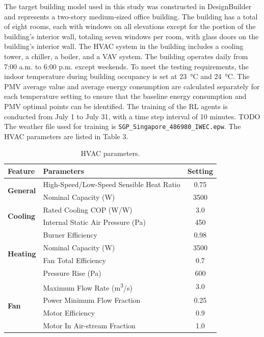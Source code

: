 \documentclass[preprint,12pt]{elsarticle}
\begin{document}

The target building model used in this study was constructed in DesignBuilder 
and represents a two-story medium-sized office building. 
The building has a total of eight rooms, each with windows on all elevations 
except for the portion of the building's interior wall, totaling seven windows per room, 
with glass doors on the building's interior wall. The HVAC system in the building 
includes a cooling tower, a chiller, a boiler, and a VAV system. 
The building operates daily from 7:00 a.m. to 6:00 p.m. except weekends.
To meet the testing requirements, the indoor temperature during building occupancy 
is set at \SI{23}{\celsius} and \SI{24}{\celsius}.
The PMV average value and average energy consumption are calculated 
separately for each temperature setting to ensure that the baseline energy consumption 
and PMV optimal points can be identified. 
The training of the RL agents is conducted from July 1 to July 31, 
with a time step interval of 10 minutes. 
TODO The weather file used for training is \texttt{SGP_Singapore_486980_IWEC.epw}.
The HVAC parameters are listed in Table 3. 
\begin{table}[h!]
\centering
\caption{HVAC parameters.}
\begin{tabular}{@{}llc@{}}
\toprule
\textbf{Feature} & \textbf{Parameters} & \textbf{Setting} \\ \midrule
\multirow{2}{*}{\textbf{General}} 
    & High-Speed/Low-Speed Sensible Heat Ratio & 0.75 \\
    & Nominal Capacity (W) & 3500 \\ \midrule
\multirow{2}{*}{\textbf{Cooling}} 
    & Rated Cooling COP (W/W) & 3.0 \\
    & Internal Static Air Pressure (Pa) & 450 \\ \midrule
\multirow{4}{*}{\textbf{Heating}} 
    & Burner Efficiency & 0.98 \\
    & Nominal Capacity (W) & 3500 \\
    & Fan Total Efficiency & 0.7 \\
    & Pressure Rise (Pa) & 600 \\ \midrule
\multirow{4}{*}{\textbf{Fan}} 
    & Maximum Flow Rate (m\textsuperscript{3}/s) & 3.0 \\
    & Power Minimum Flow Fraction & 0.25 \\
    & Motor Efficiency & 0.9 \\
    & Motor In Air-stream Fraction & 1.0 \\ \bottomrule
\end{tabular}
\label{table:hvac_parameters}
\end{table}
\end{document}

